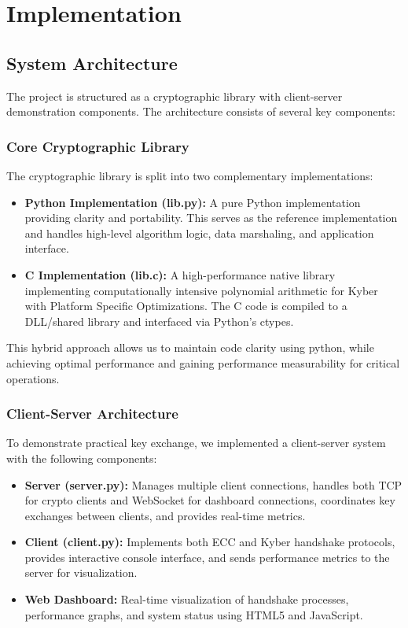 \chapter{Implementation}

\section{System Architecture}

The project is structured as a cryptographic library with client-server demonstration components. The architecture consists of several key components:

\subsection{Core Cryptographic Library}

The cryptographic library is split into two complementary implementations:

\begin{itemize}
\item \textbf{Python Implementation (lib.py):} A pure Python implementation providing clarity and portability. This serves as the reference implementation and handles high-level algorithm logic, data marshaling, and application interface.

\item \textbf{C Implementation (lib.c):} A high-performance native library implementing computationally intensive polynomial arithmetic for Kyber with Platform Specific Optimizations. The C code is compiled to a DLL/shared library and interfaced via Python's ctypes.
\end{itemize}

This hybrid approach allows us to maintain code clarity using python, while achieving optimal performance and gaining performance measurability for critical operations.

\subsection{Client-Server Architecture}

To demonstrate practical key exchange, we implemented a client-server system with the following components:

\begin{itemize}
\item \textbf{Server (server.py):} Manages multiple client connections, handles both TCP for crypto clients and WebSocket for dashboard connections, coordinates key exchanges between clients, and provides real-time metrics.

\item \textbf{Client (client.py):} Implements both ECC and Kyber handshake protocols, provides interactive console interface, and sends performance metrics to the server for visualization.

\item \textbf{Web Dashboard:} Real-time visualization of handshake processes, performance graphs, and system status using HTML5 and JavaScript.
\end{itemize}

